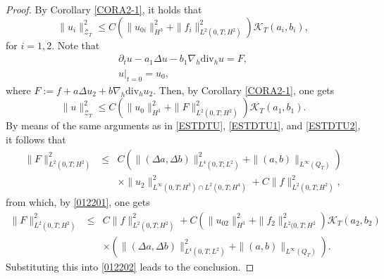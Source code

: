 \documentclass[12pt,reqno]{amsart}
\numberwithin{equation}{section}
\begin{document}
\begin{proof}
By Corollary \ref{CORA2-1}, it holds that
\begin{equation}
\|u_i\|_{\mathcal Z_T}^2
 \leq  C\left(\|u_{0i}\|_{H^3}^2+ \|f_i\|_{L^2(0,T;H^2)}^2\right)\mathcal K_T{(a_i,b_i)} , \label{012201}
\end{equation}
 for $i=1,2$.
Note that
\begin{eqnarray*}
  \partial_tu-a_1\Delta u-b_1\nabla_h\text{div}_hu=F,\\
  u|_{t=0}=u_0,
\end{eqnarray*}
where $F:=f+a\Delta u_2+b\nabla_h\text{div}_hu_2.$
Then, by Corollary \ref{CORA2-1}, one gets
\begin{equation}
\|u\|_{\mathcal Z_T}^2
 \leq C\left(\|u_0\|_{H^3}^2+ \|F\|_{L^2(0,T;H^2)}^2\right)\mathcal K_T(a_1,b_1).\label{012202}
\end{equation}
By means of the same arguments as in \eqref{ESTDTU}, \eqref{ESTDTU1}, and \eqref{ESTDTU2}, it follows that
\begin{eqnarray*}
  \|F\|_{L^2(0,T;H^2)}^2 &\leq&
    C\left(\|(\Delta a,\Delta b)\|_{L^4(0,T;L^2)}^2+\|(a,b)\|_{ L^\infty(Q_T)}\right)\\
    &&\times \| u_2\|_{L^\infty(0,T;H^3)\cap L^2(0,T;H^4)}^2 + C\|f\|_{L^2(0,T;H^2)}^2 ,
\end{eqnarray*}
from which, by \eqref{012201}, one gets
\begin{eqnarray*}
  \|F\|_{L^2(0,T;H^2)}^2
  &\leq& C\|f\|_{L^2(0,T;H^2)}^2+ C\left(\|u_{02}\|_{H^3}^2+ \|f_2\|_{L^2(0,T;H^2}^2\right)\mathcal K_T (a_2,b_2)\\
  &&\times \left(\|(\Delta a,\Delta b)\|_{L^4(0,T;L^2)}^2+\|(a,b)\|_{ L^\infty(Q_T)}\right).
\end{eqnarray*}
Substituting this into \eqref{012202} leads to the conclusion.
\end{proof}
\end{document}
